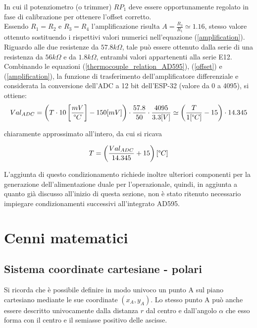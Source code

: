 \documentclass[12pt]{article}
\begin{document}
        \noindent
        In cui il potenziometro (o trimmer) $RP_1$ deve essere opportunamente regolato in fase di calibrazione per ottenere l'offset corretto.\\
        Essendo $R_1=R_2$ e $R_3=R_4$ l'amplificazione risulta $A = \frac{R_3}{R_1} \simeq 1.16$, stesso valore ottenuto sostituendo i rispettivi valori numerici nell'equazione (\ref{amplification}). Riguardo alle due resistenze da $57.8 k\Omega$, tale può essere ottenuto dalla serie di una resistenza da $56 k\Omega$ e da $1.8 k\Omega$, entrambi valori appartenenti alla serie E12.\\
        Combinando le equazioni (\ref{thermocouple_relation_AD595}), (\ref{offset}) e (\ref{amplification}), la funzione di trasferimento dell'amplificatore differenziale e considerata la conversione dell'ADC a 12 bit dell'ESP-32 (valore da 0 a 4095), si ottiene:
        \begin{equation}
            Val_{ADC} = \left( T \cdot 10 \left[ \frac{mV}{\degree C} \right] - 150 [mV] \right) \cdot \frac{57.8}{50} \cdot \frac{4095}{3.3[V]} \simeq \left( \frac{T}{1 [\degree C]} - 15 \right) \cdot  14.345
        \end{equation}
        
        \noindent
        chiaramente approssimato all'intero, da cui si ricava
        
        \begin{equation}
            T = \left( \frac{Val_{ADC}}{14.345} + 15 \right) [\degree C]
        \end{equation}
    
        \noindent
        L'aggiunta di questo condizionamento richiede inoltre ulteriori componenti per la generazione dell'alimentazione duale per l'operazionale, quindi, in aggiunta a quanto già discusso all'inizio di questa sezione, non è stato ritenuto necessario impiegare condizionamenti successivi all'integrato AD595.
\vspace{1cm}

\section{Cenni matematici}
    \subsection{Sistema coordinate cartesiane - polari}
    Si ricorda che è possibile definire in modo univoco un punto A sul piano cartesiano mediante le sue coordinate $(x_A, y_A)$. Lo stesso punto A può anche essere descritto univocamente dalla distanza $r$ dal centro e dall'angolo $\alpha$ che esso forma con il centro e il semiasse positivo delle ascisse.
    
\end{document}
